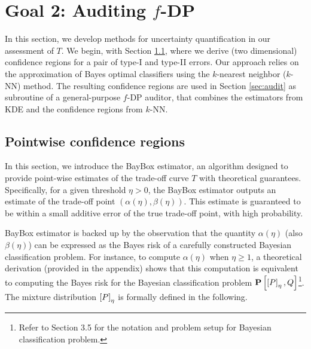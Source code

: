 \section{Goal 2: Auditing $f$-DP} \label{sec:goal2}

In this section, we develop methods for uncertainty quantification in our assessment of $T$. We begin, with Section \ref{sec:conf}, where we derive (two dimensional) confidence regions for a pair of type-I and type-II errors. Our approach relies on the approximation of Bayes optimal classifiers using the $k$-nearest neighbor ($k$-NN) method. The resulting confidence regions are used in Section \ref{sec:audit} as subroutine of a general-purpose $f$-DP auditor, that combines the estimators from KDE and the confidence regions from $k$-NN. 



\subsection{Pointwise confidence regions} \label{sec:conf}

In this section, we introduce the BayBox estimator, an algorithm designed to provide point-wise estimates of the trade-off curve $T$ with theoretical guarantees. Specifically, for a given threshold $\eta > 0$, the BayBox estimator outputs an estimate of the trade-off point $(\alpha(\eta), \beta(\eta))$. This estimate is guaranteed to be within a small additive error of the true trade-off point, with high probability.

BayBox estimator is backed up by the observation that the quantity $\alpha(\eta)$ (also $\beta(\eta)$) can be expressed as the Bayes risk of a carefully constructed Bayesian classification problem. For instance, to compute $\alpha(\eta)$ when $\eta \geq 1$, a theoretical derivation (provided in the appendix) shows that this computation is equivalent to computing the Bayes risk for the Bayesian classification problem $\mathbf{P}\left[\left[P\right]_{\eta}, Q\right]$\footnote{Refer to Section 3.5 for the notation and problem setup for Bayesian classification problem.}. The mixture distribution $\left[P\right]_{\eta}$ is formally defined in the following.

